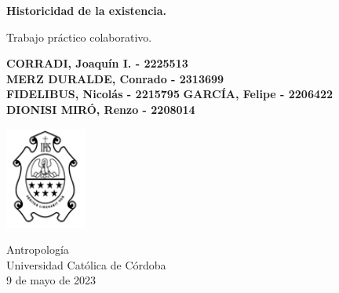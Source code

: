 \begin{titlepage}
    \begin{center}
        \vspace*{1cm}
            
        \Huge
        \textbf{Historicidad de la existencia.}
            
        \vspace{0.5cm}
        \LARGE
        Trabajo práctico colaborativo.
            
        \vspace{1.5cm}
            
        \textbf{CORRADI, Joaquín I. - 2225513}\\
        \textbf{MERZ DURALDE, Conrado - 2313699}\\
        \textbf{FIDELIBUS, Nicolás - 2215795}
        \textbf{GARCÍA, Felipe - 2206422}\\
        \textbf{DIONISI MIRÓ, Renzo - 2208014}
            
        \vfill
            
        \vspace{0.8cm}
            
        \includegraphics[width=0.2\textwidth]{logoucc.png}
            
        \Large
        Antropología\\
        Universidad Católica de Córdoba\\
        9 de mayo de 2023
            
    \end{center}
\end{titlepage}
